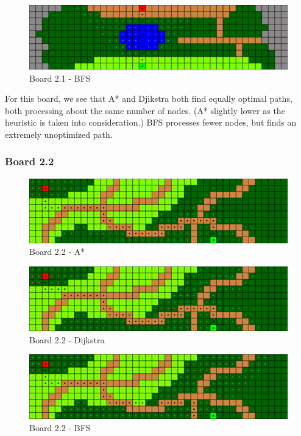 \begin{figure}[h!]
  \centering
    \includegraphics[width=\textwidth]{img/board-2-1-bfs}
    \caption{Board 2.1 - BFS}
\end{figure}

For this board, we see that A* and Djikstra both find equally optimal paths,
both processing about the same number of nodes. (A* slightly lower as the 
heuristic is taken into consideration.) BFS processes fewer nodes, but finds an
extremely unoptimized path.

\clearpage

\subsubsection*{Board 2.2}

\begin{figure}[h!]
  \centering
    \includegraphics[width=\textwidth]{img/board-2-2-astar}
    \caption{Board 2.2 - A*}
\end{figure}

\begin{figure}[h!]
  \centering
    \includegraphics[width=\textwidth]{img/board-2-2-dijkstra}
    \caption{Board 2.2 - Dijkstra}
\end{figure}

\begin{figure}[h!]
  \centering
    \includegraphics[width=\textwidth]{img/board-2-2-bfs}
    \caption{Board 2.2 - BFS}
\end{figure}

